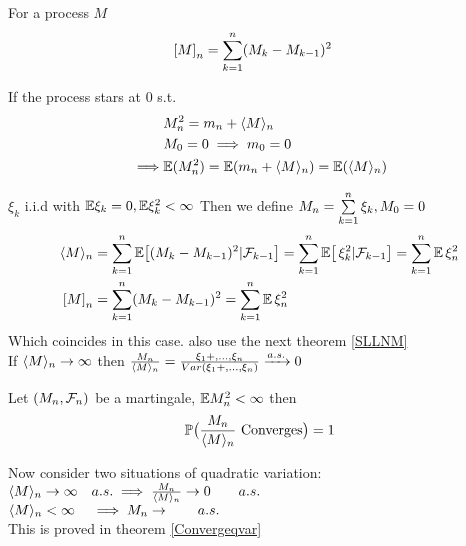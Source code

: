 \begin{dfn} For a process $M$
\begin{align*}
    \left[{M} \right]_n  &= \sum\limits_{k=1}^n (M_k -M_{k-1})^2
\end{align*}
\end{dfn}

\begin{rem}If the process stars at $0$ s.t.
\begin{align*}
    &M_n^2 = m_n + \langle{M} \rangle_n \\
    &M_0 = 0 \implies m_0 = 0 \\
    \implies& \mathbb{E}(M_n^2) = \mathbb{E}(m_n + \langle{M} \rangle_n) = \mathbb{E}(\langle{M} \rangle_n)
\end{align*}
\end{rem}

\vfill
\begin{example}
$\xi_k$ i.i.d with $\mathbb{E}\xi_k = 0, \mathbb{E}\xi_k^2 <\infty$ Then we define $M_n = \sum\limits_{k=1}^n \xi_k, M_0 = 0$
\begin{align*}
    \langle{M} \rangle_n &= \sum\limits_{k=1}^n \mathbb{E}\big[(M_k - M_{k-1})^2| \mathcal{F}_{k-1}\big] = \sum\limits_{k=1}^n \mathbb{E}\big[\,\xi_k^2| \mathcal{F}_{k-1}\big] =\sum\limits_{k=1}^n \mathbb{E} \,\xi_n^2 \\
    \left[{M} \right]_n  &= \sum\limits_{k=1}^n (M_k -M_{k-1})^2 = \sum\limits_{k=1}^n \mathbb{E} \,\xi_n^2
\end{align*} Which coincides in this case. also use the next theorem \ref{SLLNM} \\
If $\langle{M} \rangle_n \rightarrow \infty$ then $\frac{M_n}{\langle{M} \rangle_n}  = \frac{\xi_1 + ,..., \xi_n}{Var(\xi_1 + ,..., \xi_n)}\xrightarrow{a.s.} 0$
\end{example}

\newpage
\begin{thm}
\label{SLLNM}
Let $(M_n, \mathcal{F}_n)$ be a martingale, $\mathbb{E} M_n^2<\infty$ then \begin{equation*}
    \mathbb{P}\big(\frac{M_n}{\langle{M} \rangle_n} \text{ Converges}\big) = 1
\end{equation*}
\begin{rem}
Now consider two situations of quadratic variation: \\
$\langle{M} \rangle_n \rightarrow \infty \quad a.s. \implies \frac{M_n}{\langle{M} \rangle_n} \rightarrow 0 \qquad a.s.$\\
$\langle{M} \rangle_n < \infty \quad \implies M_n\rightarrow \qquad a.s.$\\ This is proved in theorem \ref{Convergeqvar}
\end{rem}
\end{thm}

